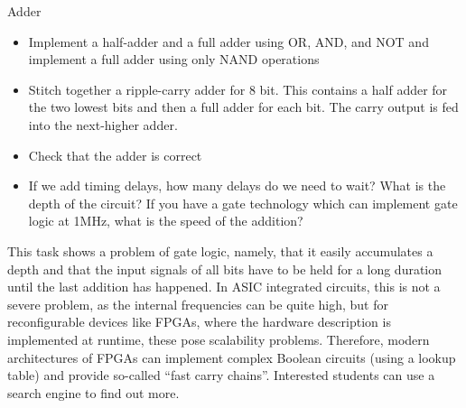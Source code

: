 \begin{task}{Adder}{}{}

  \begin{itemize}
  \item{Implement a half-adder and a full adder using OR, AND, and NOT and implement a full adder using only NAND
    operations}
  \item{Stitch together a ripple-carry adder for 8 bit. This contains a half adder for the two lowest bits and then
    a full adder for each bit. The carry output is fed into the next-higher adder.}
  \item{Check that the adder is correct}
  \item{If we add timing delays, how many delays do we need to wait? What is the depth of the circuit? If you have
  a gate technology which can implement gate logic at 1MHz, what is the speed of the addition? }
    
    \end{itemize}

  This task shows a problem of gate logic, namely, that it easily accumulates a depth and that the input signals of all bits have to be held for a long duration until the last addition has happened. In ASIC integrated circuits, this is
  not a severe problem, as the internal frequencies can be quite high, but for reconfigurable devices like FPGAs, where the hardware description is implemented at runtime, these pose scalability problems. Therefore, modern architectures
  of FPGAs can implement complex Boolean circuits (using a lookup table) and provide so-called ``fast carry chains''. Interested students can use a search engine to find out more.
  
\end{task}
